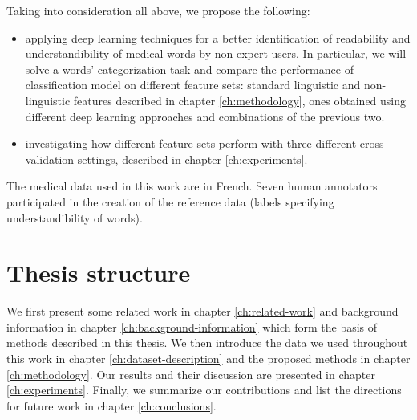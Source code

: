 Taking into consideration all above, we propose the following:
\begin{itemize}
    \item applying deep learning techniques for a better identification of readability and understandibility of medical words by non-expert users. In particular, we will solve a words' categorization task and compare the performance of classification model on different feature sets: standard linguistic and non-linguistic features described in  chapter \ref{ch:methodology}, ones obtained using different deep learning approaches and combinations of the previous two.
    \item investigating how different feature sets perform with three different cross-validation settings, described in chapter \ref{ch:experiments}. 
\end{itemize}
The medical data used in this work are in French. Seven human annotators participated in the creation of the reference data (labels specifying understandibility of words).


\section{Thesis structure}
We first present some related work in chapter \ref{ch:related-work} and background information in chapter \ref{ch:background-information} which form the basis of methods described in this thesis. We then introduce the data we used throughout this work in chapter \ref{ch:dataset-description} and the proposed methods in chapter \ref{ch:methodology}. Our results and their discussion are presented in chapter \ref{ch:experiments}. Finally, we summarize our contributions and list the directions for future work in chapter \ref{ch:conclusions}.
